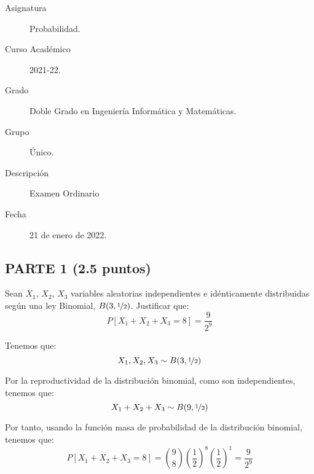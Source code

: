 \documentclass[12pt]{article}
\begin{document}

    
    

    \begin{description}
        \item[Asignatura] Probabilidad.
        \item[Curso Académico] 2021-22.
        \item[Grado] Doble Grado en Ingeniería Informática y Matemáticas.
        \item[Grupo] Único.
        \item[Descripción] Examen Ordinario 
        \item[Fecha] 21 de enero de 2022.
    
    \end{description}
    \newpage

    \subsection*{PARTE 1 (2.5 puntos)}
    \begin{ejercicio}[0.25 puntos]
        Sean $X_1$, $X_2$, $X_3$ variables aleatorias independientes e idénticamente distribuidas según una ley Binomial, $B(3,\nicefrac{1}{2})$. Justificar que: $$P[X_1 + X_2 + X_3 = 8] = \frac{9}{2^9} $$
            
        Tenemos que:
        \begin{equation*}
            X_1, X_2,X_3 \sim B(3, \nicefrac{1}{2}) 
        \end{equation*}

        Por la reproductividad de la distribución binomial, como son independientes, tenemos que:
        \begin{equation*}
            X_1 + X_2+X_3 \sim B(9, \nicefrac{1}{2})
        \end{equation*}

        Por tanto, usando la función masa de probabilidad de la distribución binomial, tenemos que:
        \begin{equation*}
            P[X_1 + X_2 + X_3 = 8] = \binom{9}{8} \left(\frac{1}{2}\right)^8 \left(\frac{1}{2}\right)^1 = \frac{9}{2^9}
        \end{equation*}
    \end{ejercicio}
\end{document}
